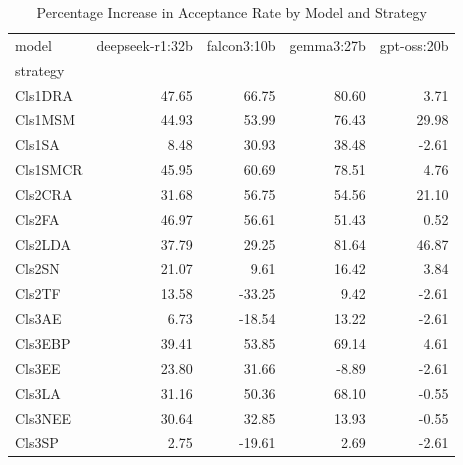 \begin{table}
\caption{Percentage Increase in Acceptance Rate by Model and Strategy}
\label{tab:pct_increase}
\begin{tabular}{lrrrr}
\toprule
model & deepseek-r1:32b & falcon3:10b & gemma3:27b & gpt-oss:20b \\
strategy &  &  &  &  \\
\midrule
Cls1DRA & 47.65 & 66.75 & 80.60 & 3.71 \\
Cls1MSM & 44.93 & 53.99 & 76.43 & 29.98 \\
Cls1SA & 8.48 & 30.93 & 38.48 & -2.61 \\
Cls1SMCR & 45.95 & 60.69 & 78.51 & 4.76 \\
Cls2CRA & 31.68 & 56.75 & 54.56 & 21.10 \\
Cls2FA & 46.97 & 56.61 & 51.43 & 0.52 \\
Cls2LDA & 37.79 & 29.25 & 81.64 & 46.87 \\
Cls2SN & 21.07 & 9.61 & 16.42 & 3.84 \\
Cls2TF & 13.58 & -33.25 & 9.42 & -2.61 \\
Cls3AE & 6.73 & -18.54 & 13.22 & -2.61 \\
Cls3EBP & 39.41 & 53.85 & 69.14 & 4.61 \\
Cls3EE & 23.80 & 31.66 & -8.89 & -2.61 \\
Cls3LA & 31.16 & 50.36 & 68.10 & -0.55 \\
Cls3NEE & 30.64 & 32.85 & 13.93 & -0.55 \\
Cls3SP & 2.75 & -19.61 & 2.69 & -2.61 \\
\bottomrule
\end{tabular}
\end{table}
